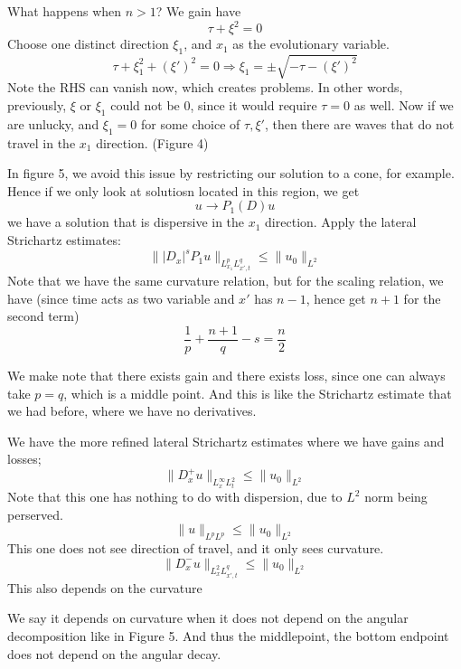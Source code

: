 What happens when $n>1$? We gain have
\begin{equation*}
    \tau+\xi^2=0
\end{equation*}
Choose one distinct direction $\xi_1$, and $x_1$ as the evolutionary variable.
\begin{equation*}
    \tau+\xi_1^2+(\xi')^2=0 \Rightarrow \xi_1=\pm\sqrt{-\tau-(\xi')^2}
\end{equation*}
Note the RHS can vanish now, which creates problems. In other words, previously, $\xi$ or $\xi_1$ could not be 0, since it would require $\tau=0$ as well. Now if we are unlucky, and $\xi_1=0$ for some choice of $\tau, \xi'$, then there are waves that do not travel in the $x_1$ direction. (Figure 4)

In figure 5, we avoid this issue by restricting our solution to a cone, for example. Hence if we only look at solutiosn located in this region, we get
\begin{equation*}
    u\to P_1(D)u
\end{equation*}
we have a solution that is dispersive in the $x_1$ direction. Apply the lateral Strichartz estimates:
\begin{equation*}
    \||D_x|^sP_1u\|_{L_{x_1}^pL_{x',t}^q}\leq\|u_0\|_{L^2}
\end{equation*}
Note that we have the same curvature relation, but for the scaling relation, we have (since time acts as two variable and $x'$ has $n-1$, hence get $n+1$ for the second term)
\begin{equation*}
    \frac{1}{p}+\frac{n+1}{q}-s=\frac{n}{2}
\end{equation*}

\begin{remark}
    We make note that there exists gain and there exists loss, since one can always take $p=q$, which is a middle point. And this is like the Strichartz estimate that we had before, where we have no derivatives.
\end{remark}

\begin{proposition}
    We have the more refined lateral Strichartz estimates where we have gains and losses;
    \begin{equation*}
        \|D_x^+u\|_{L_x^\infty L_t^2}\leq\|u_0\|_{L^2}
    \end{equation*}
    Note that this one has nothing to do with dispersion, due to $L^2$ norm being perserved.
    \begin{equation*}
        \|u\|_{L^pL^p}\leq \|u_0\|_{L^2}
    \end{equation*}
    This one does not see direction of travel, and it only sees curvature.
    \begin{equation*}
        \|D_x^- u\|_{L_x^2L_{x',t}^q}\leq\|u_0\|_{L^2}
    \end{equation*}
    This also depends on the curvature
\end{proposition}
\begin{remark}
    We say it depends on curvature when it does not depend on the angular decomposition like in Figure 5. And thus the middlepoint, the bottom endpoint does not depend on the angular decay.
\end{remark}

